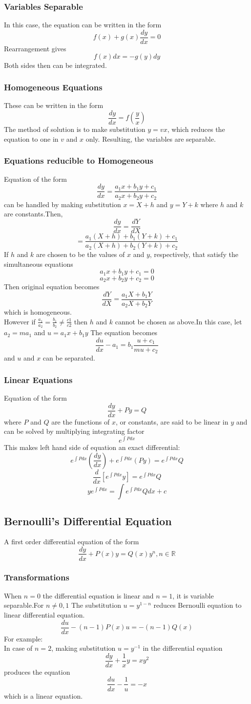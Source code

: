 \documentclass[twocolumn, 10pt]{article}
\begin{document}
\subsubsection{Variables Separable}
In this case, the equation can be written in the form $$f(x)+g(x)\frac{dy}{dx}=0$$ Rearrangement gives $$f(x)dx=-g(y)dy$$
Both sides then can be integrated.
\subsubsection{Homogeneous Equations}
These can be written in the form
$$\frac{dy}{dx}=f(\frac{y}{x})$$
The method of solution is to make substitution $y=vx$, which reduces the equation to one in $v$ and $x$ only. Resulting, the variables are separable.
\subsubsection{Equations reducible to Homogeneous}
Equation of the form  $$\frac{dy}{dx}=\frac{a_1x+b_1y+c_1}{a_2x+b_2y+c_2}$$ can be handled by making substitution $x=X+h$
and $y=Y+k$ where $h$ and $k$ are constants.Then, $$\frac{dy}{dx}=\frac{dY}{dX}$$ $$=\frac{a_1(X+h)+b_1(Y+k)+c_1}{a_2(X+h)+b_2(Y+k)+c_2}$$
If $h$ and $k$ are chosen to be the values of $x$ and $y$, respectively, that satisfy the simultaneous equations
$$a_1x+b_1y+c_1=0$$
$$a_2x+b_2y+c_2=0$$
Then original equation becomes $$\frac{dY}{dX}=\frac{a_1X+b_1Y}{a_2X+b_2Y}$$ which is homogeneous. \\
However if $\frac{a_1}{a_2}=\frac{b_1}{b_2} \not= \frac{c1}{c2}$ then $h$ and $k$ cannot be chosen as above.In this case, let $a_2=ma_1$ and $u=a_1x+b_1y$ The equation becomes $$\frac{du}{dx}-a_1=b_1 \frac{u+c_1}{mu+c_2}$$ and $u$ and $x$ can be separated.
\subsubsection{Linear Equations}
Equation of the form $$\frac{dy}{dx}+Py=Q$$ where $P$ and $Q$ are the functions of $x$, or constants, are said to be linear in $y$ and can be solved by multiplying integrating factor $$e^{\int Pdx}$$This makes left hand side of equation an exact differential:
$$e^{\int Pdx}(\frac{dy}{dx})+e^{\int Pdx}(Py)=e^{\int Pdx}Q$$
$$\frac{d}{dx}[e^{\int Pdx}y]=e^{\int Pdx}Q$$
$$ye^{\int Pdx}=\int e^{\int Pdx}Qdx+c$$
\subsection{Bernoulli's Differential Equation}
A first order differential equation of the form 
$$\frac{dy}{dx}+P(x)y=Q(x)y^n, n \in \mathbb{R}$$
\subsubsection{Transformations}
When $n=0$ the differential equation is linear and $n=1$, it is variable separable.For $n \not= 0,1$ The substitution $u=y^{1-n}$ reduces Bernoulli equation to linear differential equation.
$$\frac{du}{dx}-(n-1)P(x)u=-(n-1)Q(x)$$ 
For example: \\
In case of $n=2$, making substitution $u=y^{-1}$ in the differential equation 
$$\frac{dy}{dx}+\frac{1}{x}y=xy^2$$ produces the equation $$\frac{du}{dx}-\frac{1}{u}=-x$$ which is a linear equation.
\end{document}
